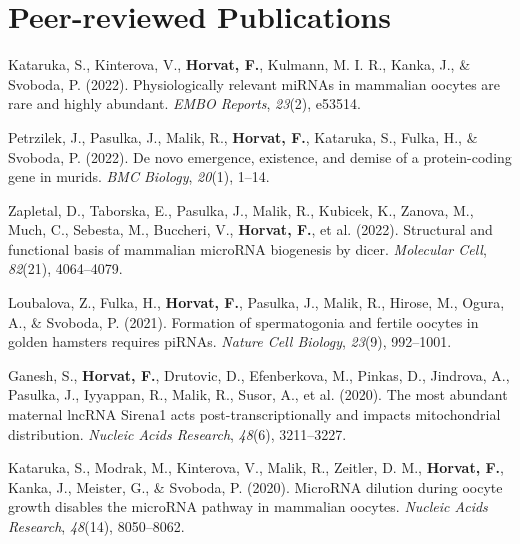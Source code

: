 \documentclass[11pt,a4paper,]{awesome-cv}
\begin{document}
\hypertarget{peer-reviewed-publications}{%
\section{Peer-reviewed Publications}\label{peer-reviewed-publications}}

\footnotesize

\hypertarget{bibliography}{}
\leavevmode{}%
Kataruka, S., Kinterova, V., \textbf{Horvat, F.}, Kulmann, M. I. R.,
Kanka, J., \& Svoboda, P. (2022). Physiologically relevant miRNAs in
mammalian oocytes are rare and highly abundant. \emph{EMBO Reports},
\emph{23}(2), e53514.

\leavevmode{}%
Petrzilek, J., Pasulka, J., Malik, R., \textbf{Horvat, F.}, Kataruka,
S., Fulka, H., \& Svoboda, P. (2022). De novo emergence, existence, and
demise of a protein-coding gene in murids. \emph{BMC Biology},
\emph{20}(1), 1--14.

\leavevmode{}%
Zapletal, D., Taborska, E., Pasulka, J., Malik, R., Kubicek, K., Zanova,
M., Much, C., Sebesta, M., Buccheri, V., \textbf{Horvat, F.}, et al.
(2022). Structural and functional basis of mammalian microRNA biogenesis
by dicer. \emph{Molecular Cell}, \emph{82}(21), 4064--4079.

\leavevmode{}%
Loubalova, Z., Fulka, H., \textbf{Horvat, F.}, Pasulka, J., Malik, R.,
Hirose, M., Ogura, A., \& Svoboda, P. (2021). Formation of spermatogonia
and fertile oocytes in golden hamsters requires piRNAs. \emph{Nature
Cell Biology}, \emph{23}(9), 992--1001.

\leavevmode{}%
Ganesh, S., \textbf{Horvat, F.}, Drutovic, D., Efenberkova, M., Pinkas,
D., Jindrova, A., Pasulka, J., Iyyappan, R., Malik, R., Susor, A., et
al. (2020). The most abundant maternal lncRNA Sirena1 acts
post-transcriptionally and impacts mitochondrial distribution.
\emph{Nucleic Acids Research}, \emph{48}(6), 3211--3227.

\leavevmode{}%
Kataruka, S., Modrak, M., Kinterova, V., Malik, R., Zeitler, D. M.,
\textbf{Horvat, F.}, Kanka, J., Meister, G., \& Svoboda, P. (2020).
MicroRNA dilution during oocyte growth disables the microRNA pathway in
mammalian oocytes. \emph{Nucleic Acids Research}, \emph{48}(14),
8050--8062.
\end{document}
